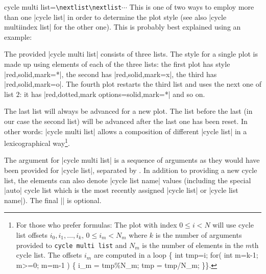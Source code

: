 \begin{pgfplotskey}{cycle multi list=\texttt{\textbackslash nextlist}\texttt{\textbackslash nextlist}$\dotsb$}
	This is one of two ways to employ more than one |cycle list| in order to determine the plot style (see also |cycle multiindex list| for the other one). This is probably best explained using an example:
\begin{codeexample}[]
\end{codeexample}
	\noindent The provided |cycle multi list| consists of three lists. The style for a single plot is made up using elements of each of the three lists: the first plot has style |red,solid,mark=*|, the second has |red,solid,mark=x|, the third has |red,solid,mark=o|. The fourth plot restarts the third list and uses the next one of list $2$: it has |red,dotted,mark options={solid},mark=*| and so on.

	The last list will always be advanced for a new plot. The list before the last (in our case the second list) will be advanced after the last one has been reset. In other words: |cycle multi list| allows a composition of different |cycle list| in a lexicographical way\footnote{For those who prefer formulas: The plot with index $0 \le i < N$ will use cycle list offsets $i_0,i_1,\dotsc,i_k$, $0 \le i_m < N_m$ where $k$ is the number of arguments provided to \texttt{cycle multi list} and $N_m$ is the number of elements in the $m$th cycle list. The offsets $i_m$ are computed in a loop {\ttfamily \{ int tmp=i;  for( int m=k-1; m>=0; m=m-1 ) \{ i\_m = tmp\%N\_m; tmp = tmp/N\_m; \}\}}.}.

	The argument for |cycle multi list| is a sequence of arguments as they would have been provided for |cycle list|, separated by \declareandlabel{\nextlist}. In addition to providing a new cycle list, the  elements can also denote |cycle list name| values (including the special |auto| cycle list which is the most recently assigned |cycle list| or |cycle list name|). The final |\nextlist| is optional.


\end{pgfplotskey}
